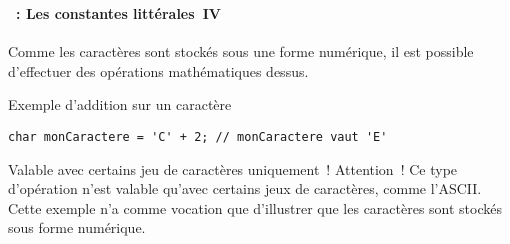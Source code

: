 \begin{frame}[containsverbatim]
  \frametitle{\secname}
  \framesubtitle{\subsecname~: Les constantes littérales~IV}

  Comme les caractères sont stockés sous une forme numérique, il est possible d'effectuer des opérations 
  mathématiques dessus.
  \begin{exampleblock}{Exemple d'addition sur un caractère}
    \begin{verbatim}
char monCaractere = 'C' + 2; // monCaractere vaut 'E'
    \end{verbatim}
  \end{exampleblock}
  \begin{alertblock}{Valable avec certains jeu de caractères uniquement~!}
    Attention~! Ce type d'opération n'est valable qu'avec certains jeux de caractères, comme l'ASCII.
        Cette exemple n'a comme vocation que d'illustrer que les caractères sont stockés sous forme numérique.
  \end{alertblock}
\end{frame}


